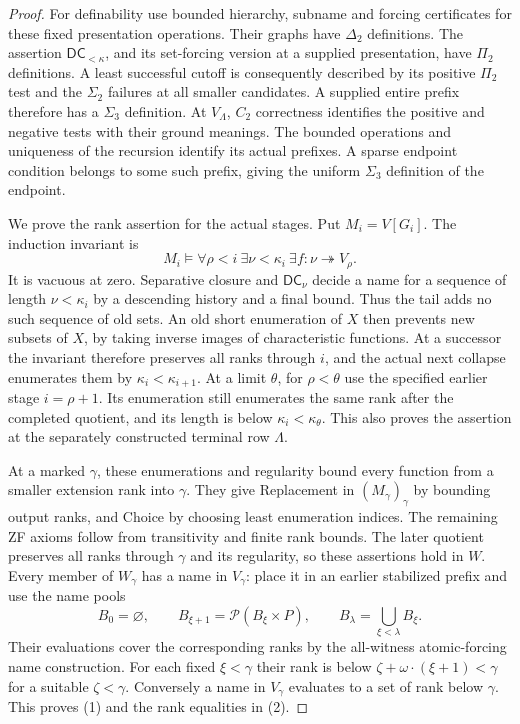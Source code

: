 \documentclass[11pt,a4paper]{amsart}
\newcommand{\DC}{\mathsf{DC}}
\theoremstyle{plain}
\theoremstyle{definition}
\theoremstyle{remark}
\begin{document}
\begin{proof}
For definability use bounded hierarchy, subname and forcing
certificates for these fixed presentation operations.
Their graphs have $\Delta_2$ definitions.  The assertion
$\DC_{<\kappa}$, and its set-forcing version at a supplied
presentation, have $\Pi_2$ definitions.  A least successful cutoff
is consequently described by its positive $\Pi_2$ test and the
$\Sigma_2$ failures at all smaller candidates.
A supplied entire prefix therefore has a $\Sigma_3$ definition.
At $V_\Lambda$, $C_2$ correctness identifies the positive and
negative tests with their ground meanings.  The bounded operations
and uniqueness of the recursion identify its actual prefixes.
A sparse endpoint condition belongs to some such prefix, giving
the uniform $\Sigma_3$ definition of the endpoint.

We prove the rank assertion for the actual stages.  Put
$M_i=V[G_i]$.  The induction invariant is
\[
M_i\models
 \forall\rho<i\ \exists\nu<\kappa_i\
 \exists f:\nu\twoheadrightarrow V_\rho.
\]
It is vacuous at zero.  Separative closure and $\DC_\nu$ decide a
name for a sequence of length $\nu<\kappa_i$ by a descending
history and a final bound.  Thus the tail adds no such sequence
of old sets.  An old short enumeration of $X$ then prevents new
subsets of $X$, by taking inverse images of characteristic
functions.  At a successor the invariant therefore preserves
all ranks through $i$, and the actual next collapse enumerates
them by $\kappa_i<\kappa_{i+1}$.  At a limit $\theta$, for
$\rho<\theta$ use the specified earlier stage $i=\rho+1$.
Its enumeration still enumerates the same rank after the
completed quotient, and its length is below
$\kappa_i<\kappa_\theta$.  This also proves the assertion at the
separately constructed terminal row $\Lambda$.

At a marked $\gamma$, these enumerations and regularity bound
every function from a smaller extension rank into $\gamma$.
They give Replacement in $(M_\gamma)_\gamma$ by bounding output
ranks, and Choice by choosing least enumeration indices.
The remaining ZF axioms follow from transitivity and finite rank
bounds.  The later quotient preserves all ranks through $\gamma$
and its regularity, so these assertions hold in $W$.
Every member of $W_\gamma$ has a name in $V_\gamma$:
place it in an earlier stabilized prefix and use the name pools
\[
B_0=\varnothing,\qquad B_{\xi+1}=\mathcal P(B_\xi\times P),
\qquad B_\lambda=\bigcup_{\xi<\lambda}B_\xi .
\]
Their evaluations cover the corresponding ranks by the
all-witness atomic-forcing name construction.  For each fixed
$\xi<\gamma$ their rank is below
$\zeta+\omega\cdot(\xi+1)<\gamma$ for a suitable $\zeta<\gamma$.
Conversely a name in $V_\gamma$ evaluates to a set of rank below
$\gamma$.  This proves (1) and the rank equalities in (2).


\end{proof}
\end{document}
